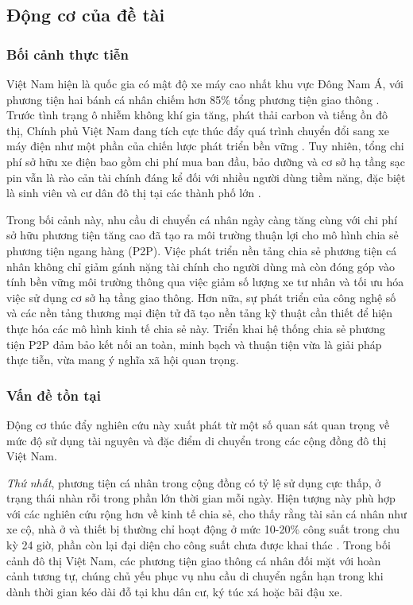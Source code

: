 \subsection{Động cơ của đề tài}

\subsubsection*{Bối cảnh thực tiễn}

Việt Nam hiện là quốc gia có mật độ xe máy cao nhất khu vực Đông Nam Á, với phương tiện hai bánh cá nhân chiếm hơn 85\% tổng phương tiện giao thông \cite{dantri2023, kevesko2023}. 
Trước tình trạng ô nhiễm không khí gia tăng, phát thải carbon và tiếng ồn đô thị, Chính phủ Việt Nam đang tích cực thúc đẩy quá trình chuyển đổi sang xe máy điện như một phần của chiến lược phát triển bền vững \cite{phs2023}. 
Tuy nhiên, tổng chi phí sở hữu xe điện bao gồm chi phí mua ban đầu, bảo dưỡng và cơ sở hạ tầng sạc pin vẫn là rào cản tài chính đáng kể đối với nhiều người dùng tiềm năng, đặc biệt là sinh viên và cư dân đô thị tại các thành phố lớn \cite{vnbusiness2023}.

Trong bối cảnh này, nhu cầu di chuyển cá nhân ngày càng tăng cùng với chi phí sở hữu phương tiện tăng cao đã tạo ra môi trường thuận lợi cho mô hình chia sẻ phương tiện ngang hàng (P2P). 
Việc phát triển nền tảng chia sẻ phương tiện cá nhân không chỉ giảm gánh nặng tài chính cho người dùng mà còn đóng góp vào tính bền vững môi trường thông qua việc giảm số lượng xe tư nhân và tối ưu hóa việc sử dụng cơ sở hạ tầng giao thông. 
Hơn nữa, sự phát triển của công nghệ số và các nền tảng thương mại điện tử đã tạo nền tảng kỹ thuật cần thiết để hiện thực hóa các mô hình kinh tế chia sẻ này. Triển khai hệ thống chia sẻ phương tiện P2P đảm bảo kết nối an toàn, minh bạch và thuận tiện vừa là giải pháp thực tiễn, vừa mang ý nghĩa xã hội quan trọng.

\subsubsection*{Vấn đề tồn tại}

Động cơ thúc đẩy nghiên cứu này xuất phát từ một số quan sát quan trọng về mức độ sử dụng tài nguyên và đặc điểm di chuyển trong các cộng đồng đô thị Việt Nam. 

\textit{Thứ nhất}, phương tiện cá nhân trong cộng đồng có tỷ lệ sử dụng cực thấp, ở trạng thái nhàn rỗi trong phần lớn thời gian mỗi ngày. 
Hiện tượng này phù hợp với các nghiên cứu rộng hơn về kinh tế chia sẻ, cho thấy rằng tài sản cá nhân như xe cộ, nhà ở và thiết bị thường chỉ hoạt động ở mức 10-20\% công suất trong chu kỳ 24 giờ, phần còn lại đại diện cho công suất chưa được khai thác \cite{chen2022}. 
Trong bối cảnh đô thị Việt Nam, các phương tiện giao thông cá nhân đối mặt với hoàn cảnh tương tự, chúng chủ yếu phục vụ nhu cầu di chuyển ngắn hạn trong khi dành thời gian kéo dài đỗ tại khu dân cư, ký túc xá hoặc bãi đậu xe.

